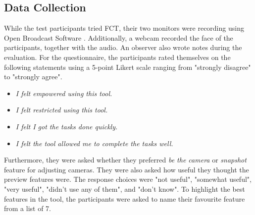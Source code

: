 \subsection{Data Collection}
While the test participants tried FCT, their two monitors were recording using Open Broadcast Software \cite{obs_cam}. Additionally, a webcam recorded the face of the participants, together with the audio. An observer also wrote notes during the evaluation. For the questionnaire, the participants rated themselves on the following statements using a 5-point Likert scale ranging from "strongly disagree" to "strongly agree". 
\begin{itemize}[noitemsep,nolistsep]
\item \textit{I felt empowered using this tool.}
\item \textit{I felt restricted using this tool.}
\item \textit{I felt I got the tasks done quickly.}
\item \textit{I felt the tool allowed me to complete the tasks well.}
\end{itemize}
Furthermore, they were asked whether they preferred \textit{be the camera} or \textit{snapshot} feature for adjusting cameras. They were also asked how useful they thought the preview features were. The response choices were "not useful", "somewhat useful", "very useful", "didn't use any of them", and "don't know". To highlight the best features in the tool, the participants were asked to name their favourite feature from a list of 7.
